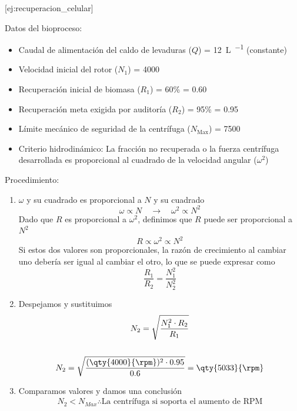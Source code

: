 [ej:recuperacion_celular]{
    Datos del bioproceso:
    \begin{itemize}
        \item Caudal de alimentación del caldo de levaduras ($Q$) = \qty{12}{\L\per\min} (constante)
        \item Velocidad inicial del rotor ($N_{1}$) = \qty{4000}{\rpm}
        \item Recuperación inicial de biomasa ($R_{1}$) = 60\% = 0.60
        \item Recuperación meta exigida por auditoría ($R_{2}$) = 95\% = 0.95
        \item Límite mecánico de seguridad de la centrífuga ($N_{\text{Max}}$) = \qty{7500}{\rpm}
        \item Criterio hidrodinámico: La fracción no recuperada o la fuerza centrífuga desarrollada es proporcional al cuadrado de la velocidad angular ($\omega^{2}$)
    \end{itemize}
    Procedimiento:
    \begin{enumerate}
        \item $\omega$ y su cuadrado es proporcional a $N$ y su cuadrado \begin{equation*}
            \omega \propto N \quad\longrightarrow\quad \omega^{2} \propto N^{2}
        \end{equation*}
            Dado que $R$ es proporcional a $\omega^{2}$, definimos que $R$ puede ser proporcional a $N^{2}$ \begin{equation*}
            R \propto \omega^{2} \propto N^{2}
        \end{equation*}
            Si estos dos valores son proporcionales, la razón de crecimiento al cambiar uno debería ser igual al cambiar el otro, lo que se puede expresar como \begin{equation*}
            \frac{R_{1}}{R_{2}} = \frac{N_{1}^{2}}{N_{2}^{2}}
        \end{equation*}
        \item Despejamos y sustituimos \begin{gather*}
            N_{2} = \sqrt{\frac{N_{1}^{2} \cdot R_{2}}{R_{1}}}
            \\\\
            N_{2} = \sqrt{\frac{(\qty{4000}{\rpm})^{2} \cdot 0.95}{0.6}} = \qty{5033}{\rpm}
        \end{gather*}
        \item Comparamos valores y damos una conclusión  \begin{gather*}
            N_{2} < N_{Max} \therefore \text{La centrífuga si soporta el aumento de RPM}
        \end{gather*}
    \end{enumerate}
}

